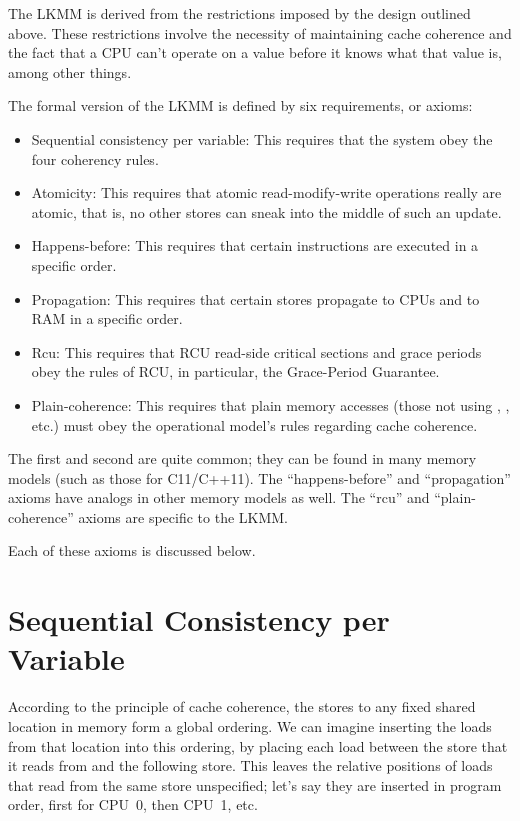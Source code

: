 The LKMM is derived from the restrictions imposed by the design
outlined above.
These restrictions involve the necessity of maintaining cache
coherence and the fact that a CPU can't operate on a value before
it knows what that value is, among other things.

The formal version of the LKMM is defined by six requirements, or
axioms:

\begin{itemize}
\item	Sequential consistency per variable:
	This requires that the system obey the four coherency rules.

\item	Atomicity:
	This requires that atomic read-modify-write operations really
	are atomic, that is, no other stores can sneak into the
	middle of such an update.

\item	Happens-before:
	This requires that certain instructions are executed in a
	specific order.

\item	Propagation:
	This requires that certain stores propagate to CPUs and to
	RAM in a specific order.

\item	Rcu:
	This requires that RCU read-side critical sections and
	grace periods obey the rules of RCU, in particular, the
	Grace-Period Guarantee.

\item	Plain-coherence:
	This requires that plain memory accesses (those not using
	, , etc.\@) must obey
	the operational model's rules regarding cache coherence.
\end{itemize}

The first and second are quite common; they can be found in many
memory models (such as those for C11/C++11).
The ``happens-before'' and ``propagation'' axioms have analogs
in other memory models as well.
The ``rcu'' and ``plain-coherence'' axioms are specific to the LKMM\@.

Each of these axioms is discussed below.


\section{Sequential Consistency per Variable}
\label{sec:docs:explanation:Sequential Consistency per Variable}

According to the principle of cache coherence, the stores to any fixed
shared location in memory form a global ordering.
We can imagine inserting the loads from that location into this
ordering, by placing each load between the store that it reads from
and the following store.
This leaves the relative positions of loads that read from the same
store unspecified; let's say they are inserted in program order,
first for CPU~0, then CPU~1, etc.

